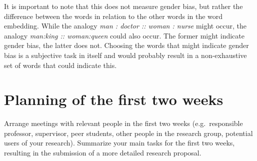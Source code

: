 \documentclass[english, a4paper, 11pt]{article}
\begin{document}
It is important to note that this does not measure gender bias, but rather the difference between the words in relation to the other words in the word embedding.
While the analogy \textit{man : doctor :: woman : nurse} might occur, the analogy \textit{man:king :: woman:queen} could also occur.
The former might indicate gender bias, the latter does not.
Choosing the words that might indicate gender bias is a subjective task in itself and would probably result in a non-exhaustive set of words that could indicate this.

\section*{Planning of the first two weeks}
Arrange meetings with relevant people in the first two weeks (e.g.\ responsible professor, supervisor, peer students, other people in the research group, potential users of your research).
Summarize your main tasks for the first two weeks, resulting in the submission of a more detailed research proposal.

\printbibliography
\end{document}
